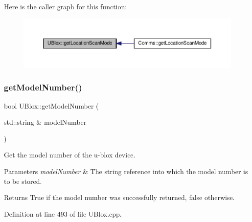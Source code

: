Here is the caller graph for this function\+:
\nopagebreak
\begin{figure}[H]
\begin{center}
\leavevmode
\includegraphics[width=350pt]{da/df6/class_u_blox_a398db4cdc2d5356fb86b3cd1021bad1b_icgraph}
\end{center}
\end{figure}
\mbox{\label{class_u_blox_ab9b9a03e10360c931686c1fe04af078d}} 
\subsubsection{\texorpdfstring{get\+Model\+Number()}{getModelNumber()}}
{\footnotesize\ttfamily bool U\+Blox\+::get\+Model\+Number (\begin{DoxyParamCaption}\item[{std\+::string \&}]{model\+Number }\end{DoxyParamCaption})}

Get the model number of the u-\/blox device.


\begin{DoxyParams}{Parameters}
{\em model\+Number} & The string reference into which the model number is to be stored. \\
\hline
\end{DoxyParams}
\begin{DoxyReturn}{Returns}
True if the model number was successfully returned, false otherwise. 
\end{DoxyReturn}


Definition at line 493 of file U\+Blox.\+cpp.


